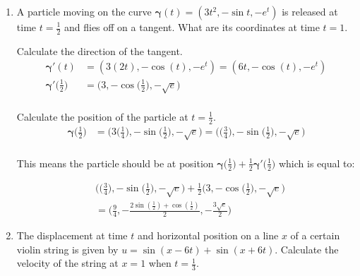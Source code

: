 \documentclass{article}
\begin{document}
\thispagestyle{fancy}

\begin{enumerate}
\item A particle moving on the curve $\boldsymbol{\gamma}(t) = (3t^2, -\sin t, -e^t)$ is released at time $t=\frac{1}{2}$ and flies off on a tangent. What are its coordinates at time $t=1$. 

Calculate the direction of the tangent.
\begin{align*} 
    \boldsymbol{\gamma}'(t) &= (3(2t), -\cos(t), -e^t) = (6t,-\cos(t), -e^t) \\
    \boldsymbol{\gamma}'\Big(\frac{1}{2}\Big) &= \Big(3, -\cos\Big(\frac{1}{2}\Big), -\sqrt{e}\Big)\\
\end{align*}

Calculate the position of the particle at $t=\frac{1}{2}$.
\begin{align*} 
    \boldsymbol{\gamma}\Big(\frac{1}{2}\Big) &= \Big(3\Big(\frac{1}{4}\Big), -\sin\Big(\frac{1}{2}\Big), -\sqrt{e}\Big) = \Big(\Big(\frac{3}{4}\Big), -\sin\Big(\frac{1}{2}\Big), -\sqrt{e}\Big)\\
\end{align*}

This means the particle should be at position $\displaystyle \boldsymbol{\gamma} \Big(\frac{1}{2}\Big) + \frac{1}{2} \boldsymbol{\gamma}' \Big( \frac{1}{2} \Big)$ which is equal to:

\begin{align*} 
    & \Big(\Big(\frac{3}{4}\Big), -\sin\Big(\frac{1}{2}\Big), -\sqrt{e}\Big) + \frac{1}{2}\Big(3, -\cos\Big(\frac{1}{2}\Big), -\sqrt{e}\Big) \\
    &= \Big(\frac{9}{4}, -\frac{ 2 \sin(\frac{1}{2}) + \cos(\frac{1}{2})}{2},-\frac{3\sqrt{e}}{2}\Big)
\end{align*}
\newpage
\item The displacement at time $t$ and horizontal position on a line $x$ of a certain violin string is given by $u=\sin(x-6t) + \sin(x+6t)$. Calculate the velocity of the string at $x=1$ when $t=\frac{1}{3}$.


\end{enumerate}
\end{document}
